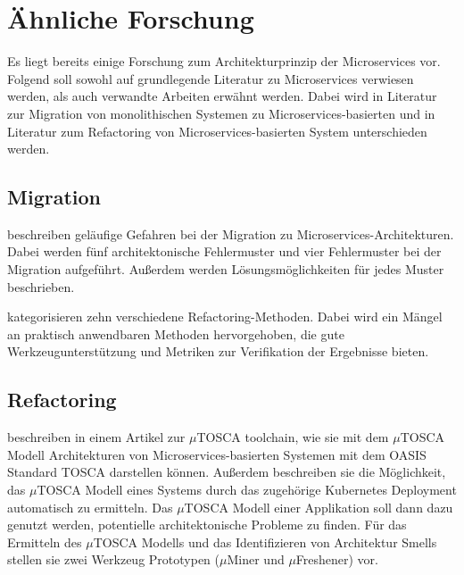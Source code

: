 \chapter{Ähnliche Forschung}

Es liegt bereits einige Forschung zum Architekturprinzip der Microservices vor.
Folgend soll sowohl auf grundlegende Literatur zu Microservices verwiesen werden, als auch verwandte Arbeiten erwähnt werden.
Dabei wird in Literatur zur Migration von monolithischen Systemen zu Microservices-basierten und in Literatur zum Refactoring von Microservices-basierten System unterschieden werden.

\section{Migration}

 beschreiben geläufige Gefahren bei der Migration zu Microservices-Architekturen. 
Dabei  werden fünf architektonische Fehlermuster und vier Fehlermuster bei der Migration aufgeführt.
Außerdem werden Lösungsmöglichkeiten für jedes Muster beschrieben.

 kategorisieren zehn verschiedene Refactoring-Methoden. 
Dabei wird ein Mängel an praktisch anwendbaren Methoden hervorgehoben, die gute Werkzeugunterstützung und Metriken zur Verifikation der Ergebnisse bieten.

\section{Refactoring}

 beschreiben in einem Artikel zur $\mu$TOSCA toolchain, wie sie mit dem  $\mu$TOSCA Modell Architekturen von Microservices-basierten Systemen mit dem OASIS Standard TOSCA darstellen können.
Außerdem beschreiben sie die Möglichkeit, das $\mu$TOSCA Modell eines Systems durch das zugehörige Kubernetes Deployment automatisch zu ermitteln.
Das $\mu$TOSCA Modell einer Applikation soll dann dazu genutzt werden, potentielle architektonische Probleme zu finden.
Für das Ermitteln des $\mu$TOSCA Modells und das Identifizieren von Architektur Smells stellen sie zwei Werkzeug Prototypen ($\mu$Miner und $\mu$Freshener) vor.
